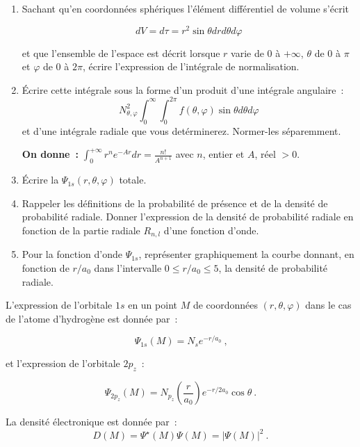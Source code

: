 \begin{enumerate}[\bf 1)]
\item Sachant qu'en coordonn\'ees sph\'eriques l'\'el\'ement diff\'erentiel de volume s'\'ecrit

$$
dV=d\tau=r^2\sin{\theta}dr d\theta d\varphi
$$

et que l'ensemble de l'espace est d\'ecrit lorsque $r$ varie de $0$ \`a $+\infty$, 
$\theta$ de $0$ \`a $\pi$ et $\varphi$ de $0$ \`a $2\pi$, \'ecrire l'expression de l'int\'egrale de 
normalisation.\\

\item \'Ecrire cette int\'egrale sous la forme d'un produit d'une int\'egrale angulaire~:
\[ 
N_{\theta,\varphi}^2 \int_0^\infty \int_0^{2\pi} f(\theta,\varphi) \sin{\theta} d\theta d\varphi
\]
et d'une int\'egrale radiale que vous det\'erminerez. Normer-les s\'eparemment.

\textbf{On donne~:} $\displaystyle \int_0^{+\infty}r^ne^{-Ar}dr=\frac{n!}{A^{n+1}}$ 
avec $n$, entier et $A$, r\'eel $> 0$.

\item \'Ecrire la $\Psi_{1s}(r,\theta,\varphi)$ totale. 

\item Rappeler les d\'efinitions de la probabilit\'e de pr\'esence et de la densit\'e 
de probabilit\'e radiale. Donner l'expression de la densit\'e de probabilit\'e radiale 
en fonction de la partie radiale $R_{n,l}$ d'une fonction d'onde.

\item Pour la fonction d'onde $\Psi_{1s}$, repr\'esenter graphiquement la courbe donnant, 
en fonction de $r/a_0$ dans l'intervalle $0 \leq r/a_0 \leq 5$, la densit\'e de 
probabilit\'e radiale.
\end{enumerate}


L'expression de l'orbitale $1s$ en un point $ M$ de coordonn\'ees  
$(r,\theta,\varphi)$ dans le cas de l'atome d'hydrog\`ene est donn\'ee par~:

$$
\Psi_{1s}(M)=N_s e^{-r/a_0} \ \text{,}
$$

et l'expression de l'orbitale $2p_z$~: 

$$
\Psi_{2p_z}(M)=
N_{p_z}\left(\frac{r}{a_0}\right)e^{-r/2a_0}\cos{\theta} \ .
$$

La densit\'e \'electronique est donn\'ee par~:
$$
D(M)=\Psi^\star(M)\Psi(M)=|\Psi(M)|^2  \ .
$$

